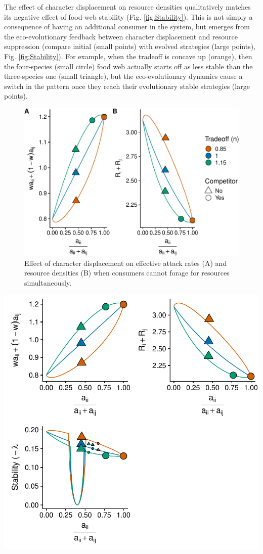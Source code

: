 \documentclass[11pt,]{article}
\begin{document}
The effect of character displacement on resource densities qualitatively
matches its negative effect of food-web stability (Fig.
\ref{fig:Stability}). This is not simply a consequence of having an
additional consumer in the system, but emerges from the eco-evolutionary
feedback between character displacement and resource suppression
(compare initial (small points) with evolved strategies (large points),
Fig. \ref{fig:Stability}). For example, when the tradeoff is concave up
(orange), then the four-species (small circle) food web actually starts
off as less stable than the three-species one (small triangle), but the
eco-evolutionary dynamics cause a switch in the pattern once they reach
their evolutionary stable strategies (large points).

\begin{figure}
\centering
\includegraphics{manuscript_ECD_model_files/figure-latex/LS_Resources-1.pdf}
\caption{\label{fig:LS_Resources}Effect of character displacement on
effective attack rates (A) and resource densities (B) when consumers
cannot forage for resources simultaneously.}
\end{figure}

\includegraphics{Figure_ECD_LS.pdf}
\end{document}
